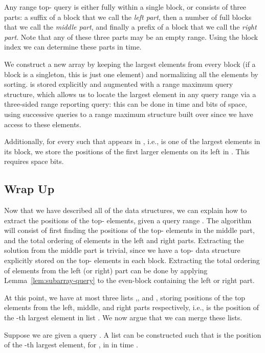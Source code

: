 \documentclass[runningheads]{llncs}
\begin{document}
Any range top- query is either fully within a single block, or
consists of three parts: a suffix of a block  that we
call the \emph{left part}, then a number of full blocks
 that we call the
\emph{middle part}, and finally a prefix of a block 
that we call the \emph{right part}.  Note that any of these three
parts may be an empty range. Using the block index we can determine
these parts in  time.

We construct a new array  by keeping the  largest elements from
every block (if a block is a singleton, this is just one element) and
normalizing all the elements by sorting.  is stored explicitly and
augmented with a range maximum query structure, which allows us to
locate the  largest element in any query range via a three-sided
range reporting query: this can be done in  time and
 bits of space, using successive queries to a range
maximum structure built over  since we have access to these
elements.

Additionally, for every  such that  appears in , i.e., is
one of the  largest elements in its block, we store the positions
of the first  larger elements on its left in . This requires
space  bits.


\subsection{Wrap Up}

Now that we have described all of the data structures, we can explain
how to extract the positions of the top- elements, given a query
range .  The algorithm will consist of first finding the
positions of the top- elements in the middle part, and the total
ordering of elements in the left and right parts.  Extracting the
solution from the middle part is trivial, since we have a top- data
structure explicitly stored on the top- elements in each block.
Extracting the total ordering of elements from the left (or right)
part can be done by applying Lemma~\ref{lem:subarray-query} to the
even-block containing the left or right part.

At this point, we have at most three lists ,, and ,
storing positions of the top elements from the left, middle, and right
parts respectively, i.e.,  is the position of the -th
largest element in list . We now argue that we can merge these
lists.

\begin{lemma}
Suppose we are given a query .  A list  can be constructed
such that  is the position of the -th largest element, for , in  in time .
\end{lemma}
\end{document}
